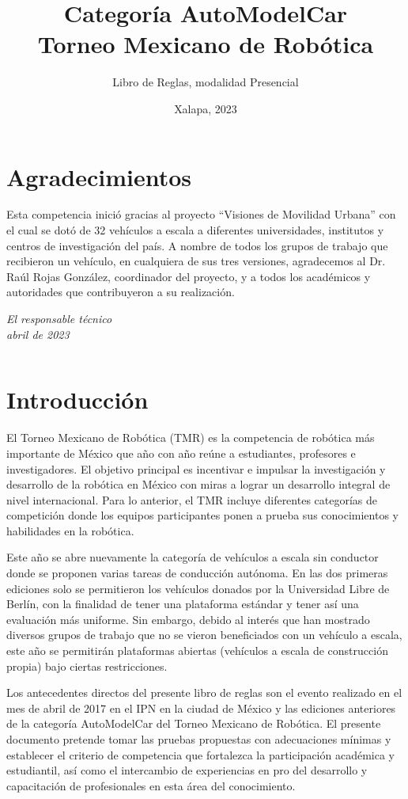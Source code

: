 \documentclass[letterpaper,12pt]{article}
\title{Categoría AutoModelCar\\Torneo Mexicano de Robótica}
\author{Libro de Reglas, modalidad Presencial}
\date{Xalapa, 2023}
\begin{document}
\renewcommand{\tablename}{Tabla}
\maketitle

\section*{Agradecimientos}
Esta competencia inició gracias al proyecto “Visiones de Movilidad Urbana” con el cual se dotó de 32 vehículos a escala a diferentes universidades, institutos y centros de investigación del país. A nombre de todos los grupos de trabajo que recibieron un vehículo, en cualquiera de sus tres versiones, agradecemos al Dr. Raúl Rojas González, coordinador del proyecto, y a todos los académicos y autoridades que contribuyeron a su realización.  
 
\begin{flushright}
  \textit{
  El responsable técnico\\
  abril de 2023
  }
\end{flushright}
\[\]
\section{Introducción}
El Torneo Mexicano de Robótica (TMR) es la competencia de robótica más importante de México que año con año reúne a estudiantes, profesores e investigadores. El objetivo principal es incentivar e impulsar la investigación y desarrollo de la robótica en México con miras a lograr un desarrollo integral de nivel internacional. Para lo anterior, el TMR incluye diferentes categorías de competición donde los equipos participantes ponen a prueba sus conocimientos y habilidades en la robótica.

Este año se abre nuevamente la categoría de vehículos a escala sin conductor donde se proponen varias tareas de conducción autónoma. En las dos primeras ediciones solo se permitieron los vehículos donados por la Universidad Libre de Berlín, con la finalidad de tener una plataforma estándar y tener así una evaluación más uniforme. Sin embargo, debido al interés que han mostrado diversos grupos de trabajo que no se vieron beneficiados con un vehículo a escala, este año se permitirán plataformas abiertas (vehículos a escala de construcción propia) bajo ciertas restricciones.

Los antecedentes directos del presente libro de reglas son el evento realizado en el mes de abril de 2017 en el IPN en la ciudad de México y las ediciones anteriores de la categoría AutoModelCar del Torneo Mexicano de Robótica. El presente documento pretende tomar las pruebas propuestas con adecuaciones mínimas y establecer el criterio de competencia que fortalezca la participación académica y estudiantil, así como el intercambio de experiencias en pro del desarrollo y capacitación de profesionales en esta área del conocimiento.
\[\]
\end{document}
